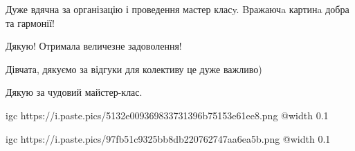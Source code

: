  
 
 
 
 

\qqSecCmt


Дуже вдячна за організацію і проведення мастер класy. Bражаючa картинa добра та
гармонії!


Дякую! Отримала величезне задоволення! 🙂


Дівчата, дякуємо за відгуки для колективу це дуже важливо)


Дякую за чудовий майстер-клас.


\ifcmt
  igc https://i.paste.pics/5132e009369833731396b75153e61ee8.png
  @width 0.1
\fi


\ifcmt
  igc https://i.paste.pics/97fb51c9325bb8db220762747aa6ea5b.png
  @width 0.1
\fi

